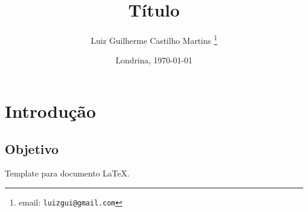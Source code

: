 \documentclass[12pt,a4papper]{article}
\title{Título}
\author{Luiz Guilherme Castilho Martins \thanks{email: \texttt{luizgui@gmail.com}}}
\date{Londrina, \today}
\begin{document}
\maketitle
\thispagestyle{empty}
\newpage

\tableofcontents
\thispagestyle{empty}
\newpage

  \section{Introdução}

  \subsection{Objetivo}
  Template para documento \LaTeX.
\end{document}

